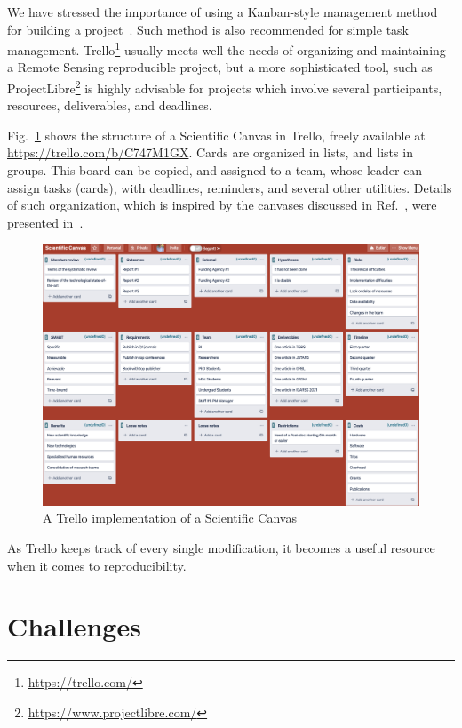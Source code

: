 \documentclass[journal,twoside]{IEEEtran}
\begin{document}
We have stressed the importance of using a Kanban-style management method for building a project~\cite{SuccessfulScientificPublishingfromtheProjecttotheAdvertising}.
Such method is also recommended for simple task management.
Trello\footnote{\url{https://trello.com/}} usually meets well the needs of organizing and maintaining a Remote Sensing reproducible project, but a more sophisticated tool, such as ProjectLibre\footnote{\url{https://www.projectlibre.com/}} is highly advisable for projects which involve several participants, resources, deliverables, and deadlines.

Fig.~\ref{Fig:ScientificCanvas} shows the structure of a Scientific Canvas in Trello, freely available at \url{https://trello.com/b/C747M1GX}.
Cards are organized in lists, and lists in groups.
This board can be copied, and assigned to a team, whose leader can assign tasks (cards), with deadlines, reminders, and several other utilities.
Details of such organization, which is inspired by the canvases discussed in Ref.~\cite{osterwalder2010business}, were presented in~\cite{SuccessfulScientificPublishingfromtheProjecttotheAdvertising}.

\begin{figure}[hbt]
\centering
\includegraphics[width=\linewidth]{ScientificCanvas}
\caption{A Trello implementation of a Scientific Canvas}\label{Fig:ScientificCanvas}
\end{figure}

As Trello keeps track of every single modification, it becomes a useful resource when it comes to reproducibility.

\section{Challenges}
\end{document}
